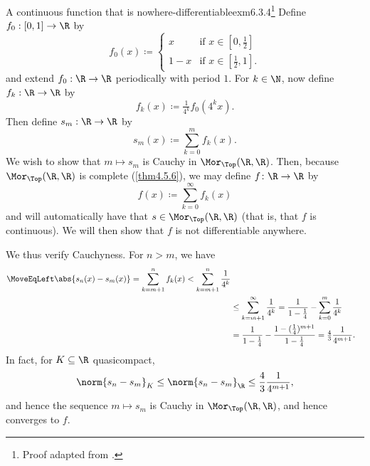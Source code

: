 \begin{exm}{A continuous function that is nowhere-differentiable}{exm6.3.4}\footnote{Proof adapted from \cite{Coleman}.}
Define $f_0:[0,1]\rightarrow \R$ by
\begin{equation}
f_0(x)\coloneqq \begin{cases}x & \text{if }x\in [0,\tfrac{1}{2}] \\ 1-x & \text{if }x\in [\tfrac{1}{2},1].\end{cases}
\end{equation}
and extend $f_0:\R \rightarrow \R$ periodically with period $1$.  For $k\in \N$, now define $f_k:\R \rightarrow \R$ by
\begin{equation}
f_k(x)\coloneqq \tfrac{1}{4^k}f_0(4^kx).
\end{equation}
Then define $s_m:\R \rightarrow \R$ by
\begin{equation}
s_m(x)\coloneqq \sum _{k=0}^mf_k(x).
\end{equation}
We wish to show that $m\mapsto s_m$ is Cauchy in $\Mor _{\Top}(\R,\R )$.    Then, because $\Mor _{\Top}(\R ,\R )$ is complete (\cref{thm4.5.6}), we may define $f\colon \R \rightarrow \R$ by
\begin{equation}
f(x)\coloneqq \sum _{k=0}^\infty f_k(x)
\end{equation}
and will automatically have that $s\in \Mor _{\Top}(\R ,\R )$ (that is, that $f$ is continuous).  We will then show that $f$ is not differentiable anywhere.

We thus verify Cauchyness.  For $n>m$, we have
\begin{equation}
\begin{split}
\MoveEqLeft
\abs{s_n(x)-s_m(x)}=\sum _{k=m+1}^nf_k(x)<\sum _{k=m+1}^n\frac{1}{4^k} \\
& \leq \sum _{k=m+1}^\infty \frac{1}{4^k}=\frac{1}{1-\tfrac{1}{4}}-\sum _{k=0}^m\frac{1}{4^k} \\
& =\frac{1}{1-\tfrac{1}{4}}-\frac{1-(\tfrac{1}{4})^{m+1}}{1-\tfrac{1}{4}}=\tfrac{4}{3}\frac{1}{4^{m+1}}.
\end{split}
\end{equation}
In fact, for $K\subseteq \R$ quasicompact,
\begin{equation}
\norm{s_n-s_m}_K\leq \norm{s_n-s_m}_{\R}\leq \frac{4}{3}\frac{1}{4^{m+1}},
\end{equation}
and hence the sequence $m\mapsto s_m$ is Cauchy in $\Mor _{\Top}(\R ,\R )$, and hence converges to $f$.


\end{exm}
